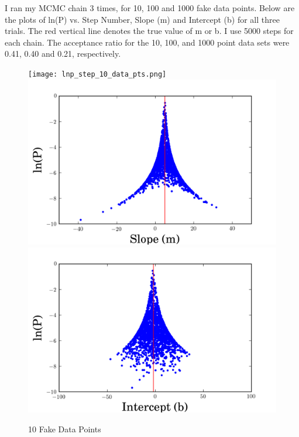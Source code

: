 \documentclass[english,12pt]{article}
\begin{document}
I ran my MCMC chain 3 times, for 10, 100 and 1000 fake data points. Below are the plots of ln(P) vs. Step Number, Slope (m) and Intercept (b) for all three trials. The red vertical line denotes the true value of m or b. I use 5000 steps for each chain. The acceptance ratio for the 10, 100, and 1000 point data sets were 0.41, 0.40 and 0.21, respectively.


\begin{figure}[H]
\caption{10 Fake Data Points}
  \texttt{[image: lnp\_step\_10\_data\_pts.png]}
\endminipage\hfill
{}
  \includegraphics[width=\linewidth]{lnp_m_10_data_points.png}
\endminipage\hfill
{}%
  \includegraphics[width=\linewidth]{lnp_b_10_data_points.png}
\endminipage\hfill
\end{figure}
\end{document}
